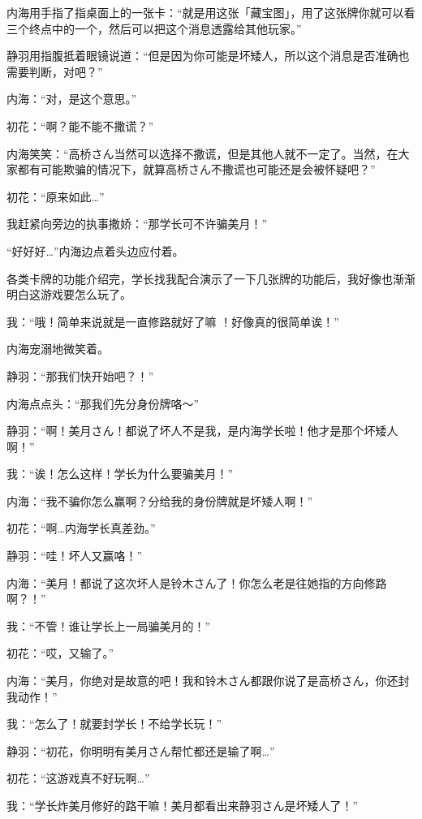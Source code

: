 内海用手指了指桌面上的一张卡：“就是用这张「藏宝图」，用了这张牌你就可以看三个终点中的一个，然后可以把这个消息透露给其他玩家。”

静羽用指腹抵着眼镜说道：“但是因为你可能是坏矮人，所以这个消息是否准确也需要判断，对吧？”

内海：“对，是这个意思。”

初花：“啊？能不能不撒谎？”

内海笑笑：“高桥さん当然可以选择不撒谎，但是其他人就不一定了。当然，在大家都有可能欺骗的情况下，就算高桥さん不撒谎也可能还是会被怀疑吧？”

初花：“原来如此…”

我赶紧向旁边的执事撒娇：“那学长可不许骗美月！”

“好好好…”内海边点着头边应付着。

各类卡牌的功能介绍完，学长找我配合演示了一下几张牌的功能后，我好像也渐渐明白这游戏要怎么玩了。

我：“哦！简单来说就是一直修路就好了嘛 ！好像真的很简单诶！”

内海宠溺地微笑着。

静羽：“那我们快开始吧？！”

内海点点头：“那我们先分身份牌咯～”


静羽：“啊！美月さん！都说了坏人不是我，是内海学长啦！他才是那个坏矮人啊！”

我：“诶！怎么这样！学长为什么要骗美月！”

内海：“我不骗你怎么赢啊？分给我的身份牌就是坏矮人啊！”

初花：“啊…内海学长真差劲。”


静羽：“哇！坏人又赢咯！”

内海：“美月！都说了这次坏人是铃木さん了！你怎么老是往她指的方向修路啊？！”

我：“不管！谁让学长上一局骗美月的！”

初花：“哎，又输了。”


内海：“美月，你绝对是故意的吧！我和铃木さん都跟你说了是高桥さん，你还封我动作！”

我：“怎么了！就要封学长！不给学长玩！”

静羽：“初花，你明明有美月さん帮忙都还是输了啊…”

初花：“这游戏真不好玩啊…”


我：“学长炸美月修好的路干嘛！美月都看出来静羽さん是坏矮人了！”

